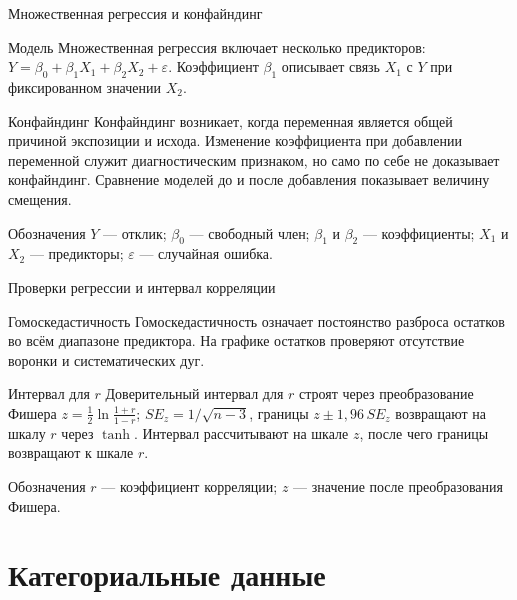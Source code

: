 \documentclass[aspectratio=169]{beamer}
\begin{document}
\begin{frame}{Множественная регрессия и конфайндинг}
  \begin{block}{Модель}\footnotesize
    Множественная регрессия включает несколько предикторов: $Y=\beta_0+\beta_1X_1+\beta_2X_2+\varepsilon$. Коэффициент $\beta_1$ описывает связь $X_1$ с $Y$ при фиксированном значении $X_2$.
  \end{block}
  \begin{block}{Конфайндинг}\footnotesize
    Конфайндинг возникает, когда переменная является общей причиной экспозиции и исхода. Изменение коэффициента при добавлении переменной служит диагностическим признаком, но само по себе не доказывает конфайндинг. Сравнение моделей до и после добавления показывает величину смещения.
  \end{block}
  \begin{block}{Обозначения}\tiny
    $Y$ — отклик; $\beta_0$ — свободный член; $\beta_1$ и $\beta_2$ — коэффициенты; $X_1$ и $X_2$ — предикторы; $\varepsilon$ — случайная ошибка.
  \end{block}
\end{frame}

\begin{frame}{Проверки регрессии и интервал корреляции}
  \begin{block}{Гомоскедастичность}\footnotesize
    Гомоскедастичность означает постоянство разброса остатков во всём диапазоне предиктора. На графике остатков проверяют отсутствие воронки и систематических дуг.
  \end{block}
  \begin{block}{Интервал для $r$}\footnotesize
    Доверительный интервал для $r$ строят через преобразование Фишера $z=\frac{1}{2}\ln\frac{1+r}{1-r}$; $SE_z=1/\sqrt{n-3}$, границы $z\pm1{,}96\,SE_z$ возвращают на шкалу $r$ через $\tanh$. Интервал рассчитывают на шкале $z$, после чего границы возвращают к шкале $r$.
  \end{block}
  \begin{block}{Обозначения}\tiny
    $r$ — коэффициент корреляции; $z$ — значение после преобразования Фишера.
  \end{block}
\end{frame}

\section{Категориальные данные}
\end{document}

